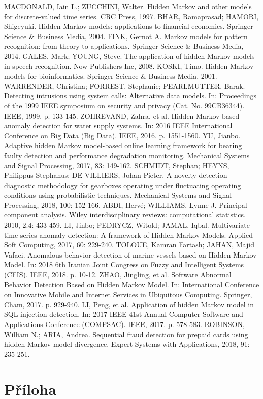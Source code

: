 \documentclass[11pt,twoside,openright]{report}
\begin{document}
\begin{thebibliography}{L}
MACDONALD, Iain L.; ZUCCHINI, Walter. Hidden Markov and other models for discrete-valued time series. CRC Press, 1997.
BHAR, Ramaprasad; HAMORI, Shigeyuki. Hidden Markov models: applications to financial economics. Springer Science \& Business Media, 2004.
FINK, Gernot A. Markov models for pattern recognition: from theory to applications. Springer Science \& Business Media, 2014.
GALES, Mark; YOUNG, Steve. The application of hidden Markov models in speech recognition. Now Publishers Inc, 2008.
KOSKI, Timo. Hidden Markov models for bioinformatics. Springer Science \& Business Media, 2001.
WARRENDER, Christina; FORREST, Stephanie; PEARLMUTTER, Barak. Detecting intrusions using system calls: Alternative data models. In: Proceedings of the 1999 IEEE symposium on security and privacy (Cat. No. 99CB36344). IEEE, 1999. p. 133-145.
ZOHREVAND, Zahra, et al. Hidden Markov based anomaly detection for water supply systems. In: 2016 IEEE International Conference on Big Data (Big Data). IEEE, 2016. p. 1551-1560.
YU, Jianbo. Adaptive hidden Markov model-based online learning framework for bearing faulty detection and performance degradation monitoring. Mechanical Systems and Signal Processing, 2017, 83: 149-162.
SCHMIDT, Stephan; HEYNS, Philippus Stephanus; DE VILLIERS, Johan Pieter. A novelty detection diagnostic methodology for gearboxes operating under fluctuating operating conditions using probabilistic techniques. Mechanical Systems and Signal Processing, 2018, 100: 152-166.
ABDI, Hervé; WILLIAMS, Lynne J. Principal component analysis. Wiley interdisciplinary reviews: computational statistics, 2010, 2.4: 433-459.
LI, Jinbo; PEDRYCZ, Witold; JAMAL, Iqbal. Multivariate time series anomaly detection: A framework of Hidden Markov Models. Applied Soft Computing, 2017, 60: 229-240.
TOLOUE, Kamran Fartash; JAHAN, Majid Vafaei. Anomalous behavior detection of marine vessels based on Hidden Markov Model. In: 2018 6th Iranian Joint Congress on Fuzzy and Intelligent Systems (CFIS). IEEE, 2018. p. 10-12.
ZHAO, Jingling, et al. Software Abnormal Behavior Detection Based on Hidden Markov Model. In: International Conference on Innovative Mobile and Internet Services in Ubiquitous Computing. Springer, Cham, 2017. p. 929-940.
LI, Peng, et al. Application of hidden Markov model in SQL injection detection. In: 2017 IEEE 41st Annual Computer Software and Applications Conference (COMPSAC). IEEE, 2017. p. 578-583.
ROBINSON, William N.; ARIA, Andrea. Sequential fraud detection for prepaid cards using hidden Markov model divergence. Expert Systems with Applications, 2018, 91: 235-251.

\end{thebibliography}



\clearpage
\chapter*{Příloha}
\begin{appendices}

\end{appendices}
\end{document}
